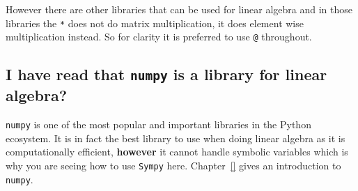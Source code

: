However there are other libraries that can be used for linear algebra and in
those libraries the \texttt{*} does not do matrix multiplication, it does element wise
multiplication instead. So for clarity it is preferred to use \texttt{@} throughout.


\subsection{I have read that \texttt{numpy} is a library for linear algebra?}
\label{\detokenize{tools-for-mathematics/04-matrices/why/main:i-have-read-that-numpy-is-a-library-for-linear-algebra}}

\texttt{numpy} is one of the most popular and important libraries in the Python
ecosystem. It is in fact the best library to use when doing linear algebra as it
is computationally efficient, \textbf{however} it cannot handle symbolic variables
which is why you are seeing how to use \texttt{Sympy} here. Chapter~\ref{} gives
an introduction to \texttt{numpy}.
